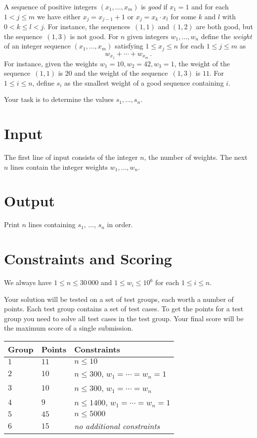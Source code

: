 
\noindent
A sequence of positive integers $(x_1,\ldots,x_m)$ is \emph{good} if  $x_1 = 1$ and for each $1 < j \leq m$ we have either $x_j=x_{j-1}+1$ or $x_j=x_k\cdot x_l$ for some $k$ and $l$ with $0< k\leq l< j$.
For instance, the sequences~$(1,1)$ and $(1,2)$ are both good, but the sequence~$(1,3)$ is not good.
For  $n$ given integers $w_1,\ldots,w_n$ define 
the \emph{weight} of an integer sequence $(x_1,\ldots,x_m)$ satisfying $1\leq x_j \leq n$ for each $1\leq j\leq m$ as
\[ w_{x_1} +\cdots +w_{x_m}\,.\] 
For instance, given the weights $w_1=10,  w_2=42,w_3= 1$, the weight of the sequence~$(1,1)$ is $20$ and the weight of the sequence~$(1,3)$ is $11$.
For $1\leq i\leq n$, define $s_i$ as the smallest weight of a good sequence containing $i$.

Your task is to determine the values $s_1,\ldots ,s_n$.

\section*{Input}

The first line of input consists of the integer $n$, the number of weights.
The next $n$ lines contain the integer weights $w_1, \ldots, w_n$.

\section*{Output}

Print $n$ lines containing $s_1$, $\ldots$, $s_n$ in order.

\section*{Constraints and Scoring}

We always have
$1\leq n \leq 30\,000$ %
and
$1\leq w_i \leq 10^6$ for each $1\leq i \leq n$.%

Your solution will be tested on a set of test groups, each worth a number of points.
Each test group contains a set of test cases.
To get the points for a test group you need to solve all test cases in the test group.
Your final score will be the maximum score of a single submission.

\medskip
\begin{tabular}{lll}
Group & Points & Constraints \\\hline
$1$   & $11$ & $n\leq 10$ \\
$2$   & $10$ & $n\leq 300$, $w_1=\cdots=w_n = 1$ \\
$3$   & $10$ & $n\leq 300$, $w_1=\cdots=w_n$ \\ %
$4$   & $9$ & $n\leq 1400$, $w_1=\cdots=w_n = 1$ \\
$5$   & $45$ & $n\leq 5000$\\
$6$   & $15$ & \emph{no additional constraints}
\end{tabular}

